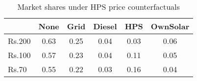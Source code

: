 \begin{table}[htbp]\centering
\caption{Market shares under HPS price counterfactuals\label {counterprices}}
\begin{tabular}{l*{5}{c}}
\toprule
            &        None&        Grid&      Diesel&         HPS&    OwnSolar\\
\midrule

Rs.200      & 0.63&        0.25&        0.04&        0.03&        0.06\\
Rs.100      &        0.57&        0.23&        0.04&        0.11&        0.05\\
Rs.70       &  0.55&        0.22&        0.03&        0.16&        0.04\\
\bottomrule
\end{tabular}
\end{table}
